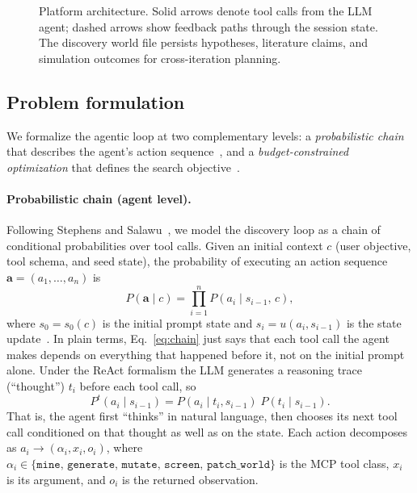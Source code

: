 \documentclass[twocolumn]{fairmeta}
\begin{document}
\begin{figure}[t]
\caption{Platform architecture. Solid arrows denote tool calls from the LLM agent; dashed arrows show feedback paths through the session state. The discovery world file persists hypotheses, literature claims, and simulation outcomes for cross-iteration planning.}
\label{fig:architecture}
\end{figure}

\subsection{Problem formulation}
\label{sec:formulation}

We formalize the agentic loop at two complementary levels: a \emph{probabilistic chain} that describes the agent's action sequence~\cite{stephens2025mathframing}, and a \emph{budget-constrained optimization} that defines the search objective~\cite{shahriari2016bayesopt}.

\paragraph{Probabilistic chain (agent level).}
Following Stephens and Salawu~\cite{stephens2025mathframing}, we model the discovery loop as a chain of conditional probabilities over tool calls.
Given an initial context $c$ (user objective, tool schema, and seed state), the probability of executing an action sequence $\mathbf{a} = (a_1, \ldots, a_n)$ is
\begin{equation}
P(\mathbf{a} \mid c) = \prod_{i=1}^{n} P(a_i \mid s_{i-1},\, c),
\label{eq:chain}
\end{equation}
where $s_0 = s_0(c)$ is the initial prompt state and $s_i = u(a_i, s_{i-1})$ is the state update~\cite{puterman1994mdp}.
In plain terms, Eq.~\ref{eq:chain} just says that each tool call the agent makes depends on everything that happened before it, not on the initial prompt alone.
Under the ReAct formalism the LLM generates a reasoning trace (``thought'') $t_i$ before each tool call, so
\begin{equation}
P^t(a_i \mid s_{i-1}) = P(a_i \mid t_i, s_{i-1})\; P(t_i \mid s_{i-1}).
\label{eq:react}
\end{equation}
That is, the agent first ``thinks'' in natural language, then chooses its next tool call conditioned on that thought as well as on the state.
Each action decomposes as $a_i \to (\alpha_i, x_i, o_i)$, where $\alpha_i \in \{\texttt{mine},\, \texttt{generate},\, \texttt{mutate},\, \texttt{screen},\, \texttt{patch\_world}\}$ is the MCP tool class, $x_i$ is its argument, and $o_i$ is the returned observation.
\end{document}
